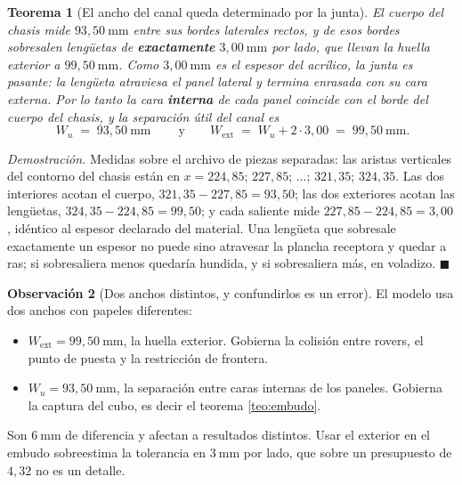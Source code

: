 \documentclass[11pt,a4paper]{article}
\newtheorem{teorema}{Teorema}[section]
\theoremstyle{definition}
\newtheorem{observacion}[teorema]{Observación}
\newenvironment{demo}{\par\noindent\textit{Demostración.}\;}{\hfill$\blacksquare$\par\medskip}
\begin{document}
\begin{teorema}[El ancho del canal queda determinado por la junta]
\label{teo:junta}
El cuerpo del chasis mide $93{,}50\ \mathrm{mm}$ entre sus bordes laterales rectos, y de
esos bordes sobresalen lengüetas de \textbf{exactamente} $3{,}00\ \mathrm{mm}$ por lado,
que llevan la huella exterior a $99{,}50\ \mathrm{mm}$. Como $3{,}00\ \mathrm{mm}$ es el
espesor del acrílico, la junta es \emph{pasante}: la lengüeta atraviesa el panel lateral
y termina enrasada con su cara externa. Por lo tanto la cara \textbf{interna} de cada
panel coincide con el borde del cuerpo del chasis, y la separación útil del canal es
\begin{equation}
  \boxed{\ W_u \;=\; 93{,}50\ \mathrm{mm}\ }
  \qquad\text{y}\qquad
  W_{\mathrm{ext}} \;=\; W_u + 2\cdot 3{,}00 \;=\; 99{,}50\ \mathrm{mm}.
  \label{eq:Wu}
\end{equation}
\end{teorema}

\begin{demo}
Medidas sobre el archivo de piezas separadas: las aristas verticales del contorno del
chasis están en $x = 224{,}85$; $227{,}85$; $\ldots$; $321{,}35$; $324{,}35$. Las dos
interiores acotan el cuerpo, $321{,}35 - 227{,}85 = 93{,}50$; las dos exteriores acotan
las lengüetas, $324{,}35 - 224{,}85 = 99{,}50$; y cada saliente mide
$227{,}85 - 224{,}85 = 3{,}00$, idéntico al espesor declarado del material. Una lengüeta
que sobresale exactamente un espesor no puede sino atravesar la plancha receptora y
quedar a ras; si sobresaliera menos quedaría hundida, y si sobresaliera más, en voladizo.
\end{demo}

\begin{observacion}[Dos anchos distintos, y confundirlos es un error]
\label{obs:dos-anchos}
El modelo usa dos anchos con papeles diferentes:
\begin{itemize}[leftmargin=2.2em,itemsep=2pt]
\item $W_{\mathrm{ext}} = 99{,}50\ \mathrm{mm}$, la huella exterior. Gobierna la
      colisión entre rovers, el punto de puesta y la restricción de frontera.
\item $W_u = 93{,}50\ \mathrm{mm}$, la separación entre caras internas de los paneles.
      Gobierna la captura del cubo, es decir el teorema \ref{teo:embudo}.
\end{itemize}
Son $6\ \mathrm{mm}$ de diferencia y afectan a resultados distintos. Usar el exterior en
el embudo sobreestima la tolerancia en $3\ \mathrm{mm}$ por lado, que sobre un
presupuesto de $4{,}32$ no es un detalle.
\end{observacion}
\end{document}
